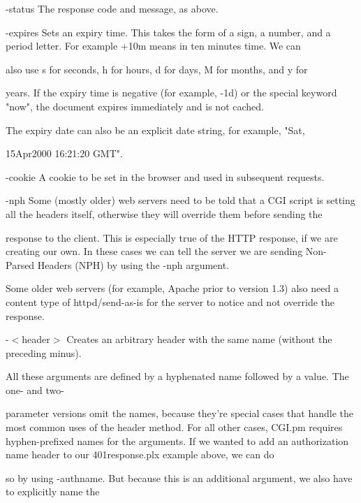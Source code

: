 \documentclass[a4paper,11pt]{book}
\begin{document}
\noindent 

\noindent -status The response code and message, as above.

\noindent 

\noindent -expires Sets an expiry time. This takes the form of a sign, a number, and a period letter. For example +10m means in ten minutes time. We can

\noindent also use s for seconds, h for hours, d for days, M for months, and y for

\noindent years. If the expiry time is negative (for example, -1d) or the special keyword "now", the document expires immediately and is not cached.

\noindent 

\noindent The expiry date can also be an explicit date string, for example, "Sat,

\noindent 15Apr2000 16:21:20 GMT".

\noindent 

\noindent -cookie A cookie to be set in the browser and used in subsequent requests.

\noindent -nph Some (mostly older) web servers need to be told that a CGI script is setting all the headers itself, otherwise they will override them before sending the

\noindent response to the client. This is especially true of the HTTP response, if we are creating our own. In these cases we can tell the server we are sending Non- Parsed Headers (NPH) by using the -nph argument.

\noindent Some older web servers (for example, Apache prior to version 1.3) also need a content type of httpd/send-as-is for the server to notice and not override the response.

\noindent -$<$header$>$ Creates an arbitrary header with the same name (without the preceding minus).

\noindent 

\noindent All these arguments are defined by a hyphenated name followed by a value. The one- and two-

\noindent parameter versions omit the names, because they're special cases that handle the most common uses of the header method. For all other cases, CGI.pm requires hyphen-prefixed names for the arguments. If we wanted to add an authorization name header to our 401response.plx example above, we can do

\noindent so by using -authname. But because this is an additional argument, we also have to explicitly name the
\end{document}
